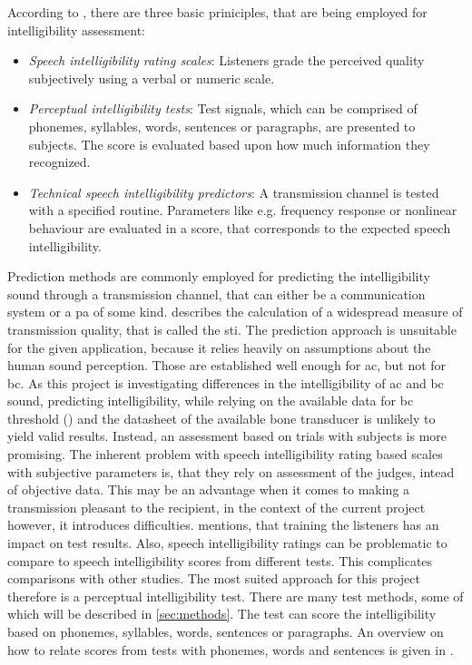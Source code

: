 According to \citep{arl_us_army}, there are three basic priniciples, that are being employed for intelligibility assessment:
\begin{itemize}
\item \textit{Speech intelligibility rating scales}: Listeners grade the perceived quality subjectively using a verbal or numeric scale.
\item \textit{Perceptual intelligibility tests}:  Test signals, which can be comprised of phonemes, syllables, words, sentences or paragraphs, are presented to subjects. The score is evaluated based upon how much information they recognized.
\item \textit{Technical speech intelligibility predictors}: A transmission channel is tested with a specified routine. Parameters like e.g. frequency response or nonlinear behaviour are evaluated in a score, that corresponds to the expected speech intelligibility.
\end{itemize}
Prediction methods are commonly employed for predicting the intelligibility sound through a transmission channel, that can either be a communication system or a \gls{pa} of some kind. \citep{iec_60268} describes the calculation of a widespread measure of transmission quality, that is called the \gls{sti}. 
The prediction approach is unsuitable for the given application, because it relies heavily on assumptions about the human sound perception. Those are established well enough for \gls{ac}, but not for \gls{bc}. As this project is investigating differences in the intelligibility of \gls{ac} and \gls{bc} sound, predicting intelligibility, while relying on the available data for \gls{bc} threshold (\citep{iso_389-3}) and the datasheet of the available bone transducer is unlikely to yield valid results.
Instead, an assessment based on trials with subjects is more promising.
The inherent problem with speech intelligibility rating based scales with subjective parameters is, that they rely on assessment of the judges, intead of objective data. This may be an advantage when it comes to making a transmission pleasant to the recipient, in the context of the current project however, it introduces difficulties.
\citep[Sec. 5.1]{arl_us_army} mentions, that training the listeners has an impact on test results. Also, speech intelligibility ratings can be problematic to compare to speech intelligibility scores from different tests. This complicates comparisons with other studies.
The most suited approach for this project therefore is a perceptual intelligibility test. There are many test methods, some of which will be described in \autoref{sec:methods}. The test can score the intelligibility based on phonemes, syllables, words, sentences or paragraphs. An overview on how to relate scores from tests with phonemes, words and sentences is given in \citep{olsen_1997}.


